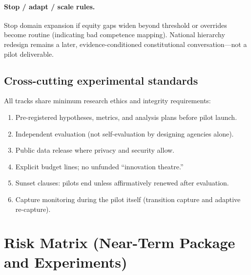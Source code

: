 \documentclass[11pt,a4paper]{article}
\begin{document}
\paragraph{Stop / adapt / scale rules.}
Stop domain expansion if equity gaps widen beyond threshold or overrides become routine (indicating bad competence mapping). National hierarchy redesign remains a later, evidence-conditioned constitutional conversation---not a pilot deliverable.

\subsection{Cross-cutting experimental standards}

All tracks share minimum research ethics and integrity requirements:

\begin{enumerate}[leftmargin=*]
    \item Pre-registered hypotheses, metrics, and analysis plans before pilot launch.
    \item Independent evaluation (not self-evaluation by designing agencies alone).
    \item Public data release where privacy and security allow.
    \item Explicit budget lines; no unfunded ``innovation theatre.''
    \item Sunset clauses: pilots end unless affirmatively renewed after evaluation.
    \item Capture monitoring during the pilot itself (transition capture and adaptive re-capture).
\end{enumerate}

\section{Risk Matrix (Near-Term Package and Experiments)}
\end{document}
